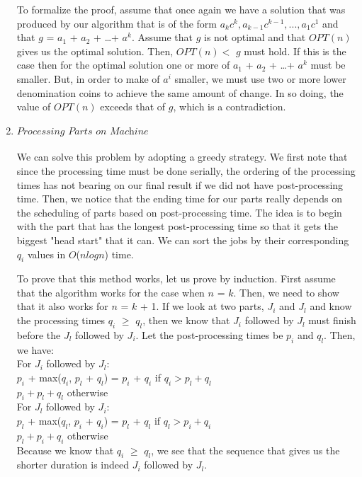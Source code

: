 \documentclass[]{report}
\begin{document}
\begin{enumerate}
	To formalize the proof, assume that once again we have a solution that was produced by our algorithm that is of the form $ a_{k}c^{k}, a_{k-1}c^{k-1}, ..., a_{1}c^{1} $ and that $ \textit{g} $ = $ a_{1} $ + $ a_{2}  $ + \dots + $ a^{k} $. Assume that $ \textit{g} $ is not optimal and that $ OPT(n) $ gives us the optimal solution. Then, $ OPT(n) < $ $ g $ must hold. If  this is the case then for the optimal solution one or more of $ a_{1} $ + $ a_{2}  $ + \dots + $ a^{k} $ must be smaller. But, in order to make of  $ a^{i} $ smaller, we must use two or more lower denomination coins to achieve the same amount of change. In so doing, the value of $ OPT(n) $ exceeds that of $ g $, which is a contradiction. 
	 
	
	
	\item $ \textit{Processing Parts on Machine } $ \\ \\
	We can solve this problem by adopting a greedy strategy. We first note that since the processing time must be done serially, the ordering of the processing times has not bearing on our final result if we did not have post-processing time. Then, we notice that the ending time for our parts really depends on the scheduling of parts based on post-processing time. The idea is to begin with the part that has the longest post-processing time so that it gets the biggest "head start" that it can. We can sort the jobs by their corresponding $ q_{i} $ values in $ O $($n log n$) time. 
	
	To prove that this method works, let us prove by induction. First assume that the algorithm works for the case when $ n $ = $ k $. Then, we need to show that it also works for  $ n $ = $ k $ + 1. If we look at two parts, $ J_{i} $ and $ J_{l} $ and know the processing times $ q_{i} $ $ \geq $ $ q_{l} $, then we know that $ J_{i} $ followed by $ J_{l}$ must finish before the $ J_{l} $ followed by $ J_{i}$. Let the post-processing times be $ p_{i} $ and $ q_{l}$. Then, we have: \\
	
	For $ J_{i} $ followed by $ J_{l}$: \\
	$ p_{i} $  + max($q_{i}$, $ p_{l} $ + $ q_{l} $) = $ p_{i} $ + $q_{i}$ if $q_{i} > p_{l} + q_{l}$  \\
																			$ p_{i} + p_{l} + q_{l} $ otherwise \\ 

	For $ J_{l} $ followed by $ J_{i}$: \\
		$ p_{l} $  + max($q_{l}$, $ p_{i} $ + $ q_{i} $) = $ p_{l} $ + $q_{l}$ if $q_{l} > p_{i} + q_{i}$  	\\
																					$ p_{l} + p_{i} + q_{i} $ otherwise \\ 												
	 Because we know that $ q_{i} $ $ \geq $ $ q_{l} $, we see that the sequence that gives us the shorter duration is indeed $ J_{i} $ followed by $ J_{l} $.																					
																											

\end{enumerate}
\end{document}
